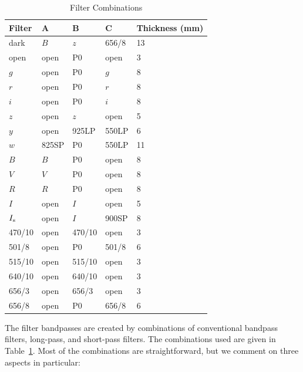\begin{table}
\begin{center}
\caption{Filter Combinations}
\label{table:filter-combinations}
\medskip
\begin{tabular}{lllll}
\hline
Filter&A&B&C&Thickness (mm)\\
\hline
dark		&$B$		&$z$		&656/8	&\phantom{}13		\\
open		&open		&P0		&open		&\phantom{0}3		\\
$g$		&open		&P0		&$g$		&\phantom{0}8		\\
$r$		&open		&P0		&$r$		&\phantom{0}8		\\
$i$			&open		&P0		&$i$		&\phantom{0}8		\\
$z$		&open		&$z$		&open		&\phantom{0}5		\\
$y$		&open		&925LP	&550LP	&\phantom{0}6		\\
$w$		&825SP	&P0		&550LP	&\phantom{}11		\\
$B$		&$B$		&P0		&open		&\phantom{0}8		\\
$V$		&$V$		&P0		&open		&\phantom{0}8		\\
$R$		&$R$		&P0		&open		&\phantom{0}8		\\
$I$		&open		&$I$		&open		&\phantom{0}5		\\
$\mbox{$I_\mathrm{s}$}$		&open		&$I$		&900SP	&\phantom{0}8		\\
470/10	&open		&470/10	&open		&\phantom{0}3		\\
501/8		&open		&P0		&501/8	&\phantom{0}6		\\
515/10	&open		&515/10	&open		&\phantom{0}3		\\
640/10	&open		&640/10	&open		&\phantom{0}3		\\
656/3		&open		&656/3	&open		&\phantom{0}3		\\
656/8		&open		&P0		&656/8	&\phantom{0}6		\\
\hline
\end{tabular}
\end{center}
\end{table}

The filter bandpasses are created by combinations of conventional bandpass filters, long-pass, and short-pass filters. The combinations used are given in Table~\ref{table:filter-combinations}. Most of the combinations are straightforward, but we comment on three aspects in particular:

